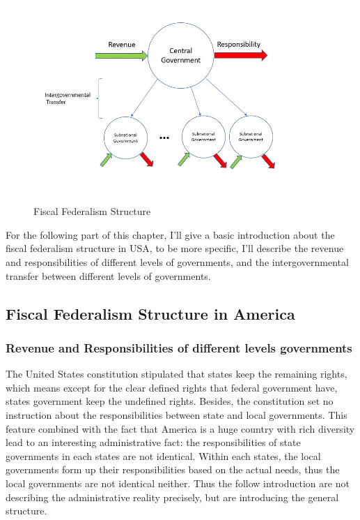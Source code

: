 \begin{figure}[htb]
    \centering
    \includegraphics[scale=0.7]{Chapter-1/Figures/fiscal federalism.JPG}
    \caption[Fiscal Federalism Structure]{Fiscal Federalism Structure
    \texttt{} }
    \label{Figure 1.1}
\end{figure}

For the following part of this chapter, I'll give a basic introduction about the fiscal federalism structure in USA, to be more specific, I'll describe the revenue and responsibilities of different levels of governments, and the intergovernmental transfer between different levels of governments.



\subsection{Fiscal Federalism Structure in America}
\subsubsection{Revenue and Responsibilities of different levels governments}
The United States constitution stipulated that states keep the remaining rights, which means except for the clear defined rights that federal government have, states government keep the undefined rights. Besides, the constitution set no instruction about the responsibilities between state and local governments. This feature combined with the fact that America is a huge country with rich diversity lead to an interesting administrative fact: the responsibilities of state governments in each states are not identical. Within each states, the local governments form up their responsibilities based on the actual needs, thus the local governments are not identical neither. Thus the follow introduction are not describing the administrative reality precisely, but are introducing the general structure.

